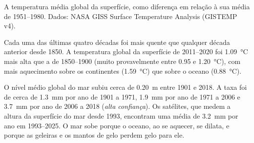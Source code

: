 \begin{omfigure}

{\small A temperatura média global da superfície, como diferença em relação
à sua média de 1951--1980. Dados: NASA GISS Surface Temperature Analysis
(GISTEMP v4).}
\end{omfigure}

\begin{proposition}\label{prop:g12:climate-change:warming}
Cada uma das últimas quatro décadas foi mais quente que qualquer década
anterior desde 1850. A temperatura global da superfície de 2011--2020 foi
\qty{1.09}{\degreeCelsius} mais alta que a de 1850--1900 (muito
provavelmente entre 0.95 e \qty{1.20}{\degreeCelsius}), com mais aquecimento
sobre os continentes (\qty{1.59}{\degreeCelsius}) que sobre o oceano
(\qty{0.88}{\degreeCelsius}).
\end{proposition}

\begin{proposition}\label{prop:g12:climate-change:sea}
O nível médio global do mar subiu cerca de \qty{0.20}{m} entre 1901 e 2018.
A taxa foi de cerca de \qty{1.3}{mm} por ano de 1901 a 1971,
\qty{1.9}{mm} por ano de 1971 a 2006 e \qty{3.7}{mm} por ano de 2006 a 2018
(\emph{alta confiança}). Os satélites, que medem a altura da superfície do
mar desde 1993, encontram uma média de \qty{3.2}{mm} por ano em 1993--2025.
O mar sobe porque o oceano, ao se aquecer, se dilata, e porque as geleiras e
os mantos de gelo perdem gelo para ele.
\end{proposition}

